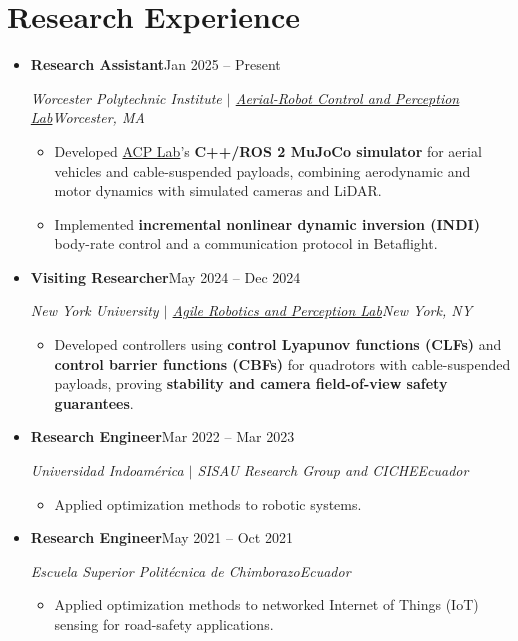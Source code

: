 \documentclass[letterpaper,11pt]{article}
\newcommand{\resumeItem}[1]{
  \item {\small #1\par}\vspace{-2pt}
}
\newcommand{\resumeSubheading}[4]{
  \vspace{-2pt}\item
    \textbf{#1}\enspace\textbar\enspace #2\\
    {\small\textit{#3\enspace\textbar\enspace #4}\par}\vspace{-5pt}
}
\newcommand{\resumeSubHeadingListStart}{\begin{itemize}[leftmargin=0.15in, label={}, topsep=3pt]}
\newcommand{\resumeSubHeadingListEnd}{\end{itemize}}
\newcommand{\resumeItemListStart}{\begin{itemize}}
\newcommand{\resumeItemListEnd}{\end{itemize}\vspace{-5pt}}
\begin{document}
\section{Research Experience}
\resumeSubHeadingListStart
\resumeSubheading{Research Assistant}{Jan 2025 -- Present}
{Worcester Polytechnic Institute $|$ \href{https://acp-lab.github.io/acplab-web/}{Aerial-Robot Control and Perception Lab}}{Worcester, MA}
\resumeItemListStart
\resumeItem{Developed \href{https://acp-lab.github.io/acplab-web/}{ACP Lab}'s \textbf{C++/ROS 2 MuJoCo simulator} for aerial vehicles and cable-suspended payloads, combining aerodynamic and motor dynamics with simulated cameras and LiDAR.}
\resumeItem{Implemented \textbf{incremental nonlinear dynamic inversion (INDI)} body-rate control and a communication protocol in Betaflight.}
\resumeItemListEnd
\resumeSubheading{Visiting Researcher}{May 2024 -- Dec 2024}
{New York University $|$ \href{https://arplaboratory.github.io/}{Agile Robotics and Perception Lab}}{New York, NY}
\resumeItemListStart
\resumeItem{Developed controllers using \textbf{control Lyapunov functions (CLFs)} and \textbf{control barrier functions (CBFs)} for quadrotors with cable-suspended payloads, proving \textbf{stability and camera field-of-view safety guarantees}.}
\resumeItemListEnd
\resumeSubheading{Research Engineer}{Mar 2022 -- Mar 2023}
{Universidad Indoam\'erica $|$ SISAU Research Group and CICHE}{Ecuador}
\resumeItemListStart
\resumeItem{Applied optimization methods to robotic systems.}
\resumeItemListEnd
\resumeSubheading{Research Engineer}{May 2021 -- Oct 2021}
{Escuela Superior Polit\'ecnica de Chimborazo}{Ecuador}
\resumeItemListStart
\resumeItem{Applied optimization methods to networked Internet of Things (IoT) sensing for road-safety applications.}
\resumeItemListEnd
\resumeSubHeadingListEnd
\end{document}
